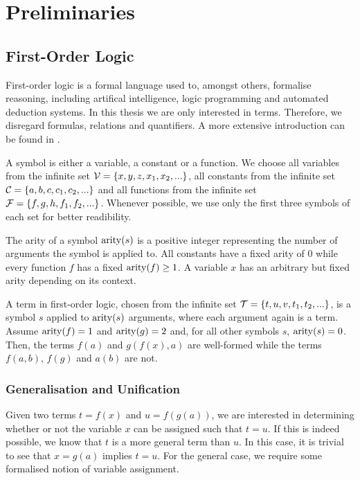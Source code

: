 \chapter{Preliminaries}
\section{First-Order Logic}
First-order logic is a formal language used to, amongst others, formalise reasoning, including artifical intelligence, logic programming and automated deduction systems. In this thesis we are only interested in terms. Therefore, we disregard formulas, relations and quantifiers. A more extensive introduction can be found in \cite{abiteboul_foundations_1995}.

A symbol is either a variable, a constant or a function. We choose all variables from the infinite set $\mathcal{V} = \{x, y, z, x_{1}, x_{2}, ...\}$, all constants from the infinite set $\mathcal{C} = \{a, b, c, c_{1}, c_{2}, ...\}$ and all functions from the infinite set $\mathcal{F} = \{f, g, h, f_{1}, f_{2}, ...\}$. Whenever possible, we use only the first three symbols of each set for better readibility.

The arity of a symbol $\mathrm{arity}(s)$ is a positive integer representing the number of arguments the symbol is applied to. All constants have a fixed arity of $0$ while every function $f$ has a fixed $\mathrm{arity}(f) \geq 1$. A variable $x$ has an arbitrary but fixed arity depending on its context.

A term in first-order logic, chosen from the infinite set $\mathcal{T} = \{t, u, v, t_{1}, t_{2}, ...\}$, is a symbol $s$ applied to $\mathrm{arity}(s)$ arguments, where each argument again is a term. Assume $\mathrm{arity}(f) = 1$ and $\mathrm{arity}(g) = 2$ and, for all other symbols $s$, $\mathrm{arity}(s) = 0$. Then, the terms $f(a)$ and $g(f(x), a)$ are well-formed while the terms $f(a,b)$, $f(g)$ and $a(b)$ are not.

\subsection{Generalisation and Unification}
Given two terms $t = f(x)$ and $u = f(g(a))$, we are interested in determining whether or not the variable $x$ can be assigned such that $t = u$. If this is indeed possible, we know that $t$ is a more general term than $u$. In this case, it is trivial to see that $x = g(a)$ implies $t = u$. For the general case, we require some formalised notion of variable assignment.

